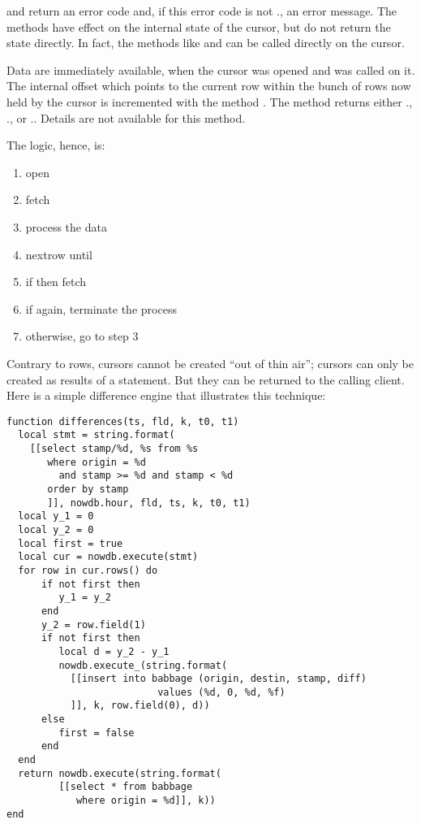  and  return an error code
and, if this error code is not .,
an error message. The methods have effect on
the internal state of the cursor, but do not return
the state directly. In fact, the  methods
like  and  can be called
directly on the cursor.

Data are immediately available,
when the cursor was opened and 
was called on it.
The internal offset which points to the current row
within the bunch of rows now held by the cursor is
incremented with the method .
The method returns either
.,
.,
or ..
Details are not available for this method.

\begin{minipage}{\textwidth}
The logic, hence, is:
\begin{enumerate}
\item open
\item fetch
\item process the data
\item nextrow until 
\item if  then fetch
\item if  again, terminate the process
\item otherwise, go to step 3 
\end{enumerate}
\end{minipage}

Contrary to rows, cursors cannot be created
``out of thin air''; cursors can only be created
as results of a  statement.
But they can be returned to the calling client.
Here is a simple difference engine that
illustrates this technique:

\begin{lua}
\begin{lstlisting}
function differences(ts, fld, k, t0, t1)
  local stmt = string.format(
    [[select stamp/%d, %s from %s
       where origin = %d
         and stamp >= %d and stamp < %d
       order by stamp
       ]], nowdb.hour, fld, ts, k, t0, t1)
  local y_1 = 0
  local y_2 = 0
  local first = true
  local cur = nowdb.execute(stmt)
  for row in cur.rows() do
      if not first then
         y_1 = y_2
      end
      y_2 = row.field(1)
      if not first then
         local d = y_2 - y_1
         nowdb.execute_(string.format(
           [[insert into babbage (origin, destin, stamp, diff)
                          values (%d, 0, %d, %f)
           ]], k, row.field(0), d))
      else
         first = false
      end
  end
  return nowdb.execute(string.format(
         [[select * from babbage
            where origin = %d]], k))
end
\end{lstlisting}
\end{lua}


